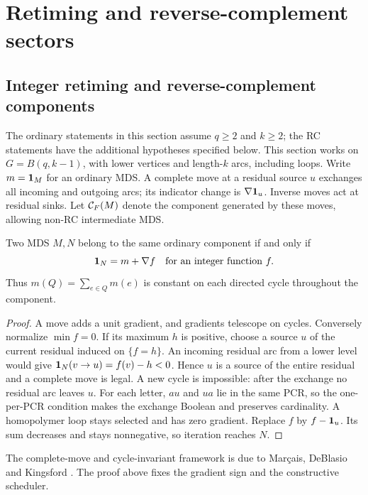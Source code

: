 \section{Retiming and reverse-complement sectors}

\subsection{Integer retiming and reverse-complement components}
\label{sec:retiming}
The ordinary statements in this section assume $q\ge2$ and $k\ge2$;
the RC statements have the additional hypotheses specified below.
This section works on $G=B(q,k-1)$, with lower vertices and
length-$k$ arcs, including loops. Write $m=\mathbf 1_M$ for an ordinary
MDS. A complete move at a residual source $u$ exchanges all
incoming and outgoing arcs; its indicator change is
$\nabla\mathbf 1_u$. Inverse moves act at residual sinks.
Let $\mathcal C_F(M)$ denote the component generated by these moves,
allowing non-RC intermediate MDS.

\begin{lemma}\label{lem:move-component}
Two MDS $M,N$ belong to the same ordinary component if and only if
\[
 \mathbf 1_N=m+\nabla f\quad\text{for an integer function }f.
\]
Thus $m(Q)=\sum_{e\in Q}m(e)$ is constant on each directed cycle
throughout the component.
\end{lemma}
\begin{proof}
A move adds a unit gradient, and gradients telescope on cycles.
Conversely normalize $\min f=0$. If its maximum $h$ is positive,
choose a source $u$ of the current residual induced on $\{f=h\}$.
An incoming residual arc from a lower level would give
$\mathbf 1_N(v\to u)=f(v)-h<0$. Hence $u$ is a source of the entire
residual and a complete move is legal. A new cycle is impossible:
after the exchange no residual arc leaves $u$. For each letter,
$au$ and $ua$ lie in the same PCR, so the one-per-PCR condition
makes the exchange Boolean and preserves cardinality.
A homopolymer loop stays selected and has zero gradient.
Replace $f$ by $f-\mathbf 1_u$. Its sum decreases and stays nonnegative,
so iteration reaches $N$.
\end{proof}
The complete-move and cycle-invariant framework is due to
Mar\c cais, DeBlasio and Kingsford
\cite[Sections 4--5]{MarcaisDeBlasioKingsford2024}.
The proof above fixes the gradient sign and the constructive scheduler.

